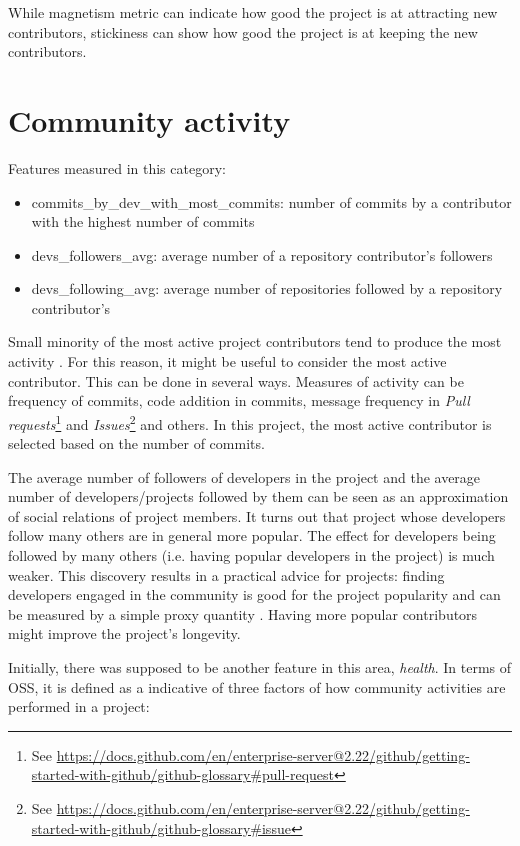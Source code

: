 While magnetism metric can indicate how good the project is at attracting new contributors, stickiness can show how good the project is at keeping the new contributors.

\section{Community activity}
\label{sec:comm_activity}

Features measured in this category:

\begin{itemize}
    \item commits\_by\_dev\_with\_most\_commits: number of commits by a contributor with the highest number of commits
    \item devs\_followers\_avg: average number of a repository contributor's followers
    \item devs\_following\_avg: average number of repositories followed by a repository contributor's
\end{itemize}

Small minority of the most active project contributors tend to produce the most activity \cite{top_dev}.
For this reason, it might be useful to consider the most active contributor.
This can be done in several ways.
Measures of activity can be frequency of commits, code addition in commits, message frequency in \emph{Pull requests}\footnote{See \url{https://docs.github.com/en/enterprise-server@2.22/github/getting-started-with-github/github-glossary\#pull-request}} and \emph{Issues}\footnote{See \url{https://docs.github.com/en/enterprise-server@2.22/github/getting-started-with-github/github-glossary\#issue}} and others.
In this project, the most active contributor is selected based on the number of commits.

The average number of followers of developers in the project and the average number of developers/projects followed by them can be seen as an approximation of social relations of project members.
It turns out that project whose developers follow many others are in general more popular.
The effect for developers being followed by many others (i.e. having popular developers in the project) is much weaker.
This discovery results in a practical advice for projects: finding developers engaged in the community is good for the project popularity and can be measured by a simple proxy quantity \cite{p:14}.
Having more popular contributors might improve the project's longevity.

Initially, there was supposed to be another feature in this area, \emph{health}.
In terms of OSS, it is defined as a indicative of three factors of how community activities are performed in a project:

